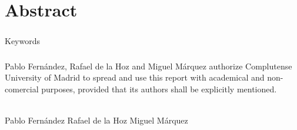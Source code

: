 \chapter{Abstract}
\label{cha:abstract}
	
	
\newpage 
	\paragraph{}
	{\huge Keywords}
	\paragraph{}


\newpage %
	\paragraph{}
	Pablo Fernández, Rafael de la Hoz and Miguel Márquez authorize Complutense University 
	of Madrid to spread and use this report with academical and non-comercial purposes,
	provided that its authors shall be explicitly mentioned.
	\begin{center}
    	\thedate \\
	    \vspace{5.5in}
		Pablo Fernández\hspace{0.75in}
		Rafael de la Hoz\hspace{0.75in}
		Miguel Márquez
	\end{center}
